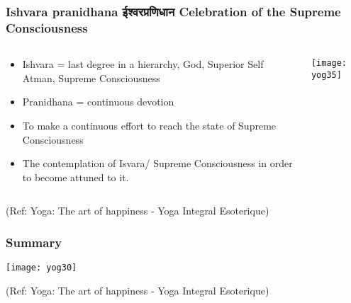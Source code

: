 \begin{frame}[fragile]\frametitle{Ishvara pranidhana ईश्वरप्रणिधान Celebration of the Supreme Consciousness }
   \begin{columns}
    \begin{column}[t]{0.7\linewidth}
	
	\begin{itemize}
	\item Ishvara = last degree in a hierarchy, God, Superior Self Atman, Supreme Consciousness 
	\item Pranidhana = continuous devotion
	\item To make a continuous effort to reach the state of Supreme Consciousness 
	\item The contemplation of Isvara/ Supreme Consciousness in order to become attuned to it.


	\end{itemize}
	    \end{column}
    \begin{column}[t]{0.3\linewidth}
\begin{center}
\texttt{[image: yog35]}

\end{center}
    \end{column}
  \end{columns}
  
  \tiny{(Ref: Yoga: The art of happiness - Yoga Integral Esoterique)}

\end{frame}


\begin{frame}[fragile]\frametitle{Summary}

\begin{center}
\texttt{[image: yog30]}

\end{center}

  
  \tiny{(Ref: Yoga: The art of happiness - Yoga Integral Esoterique)}

\end{frame}